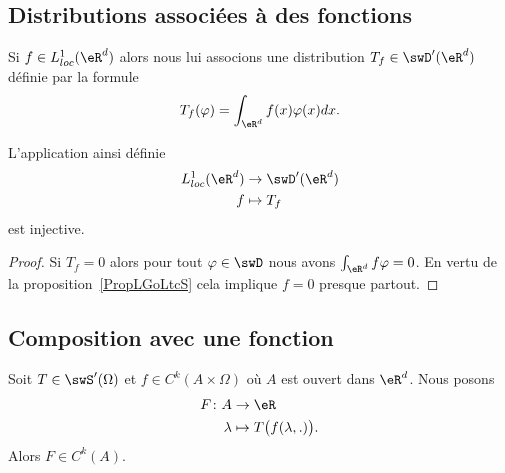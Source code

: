 \subsection{Distributions associées à des fonctions}

Si \( f\in L^1_{loc}(\eR^d)\) alors nous lui associons une distribution \( T_f\in \swD'(\eR^d)\) définie par la formule
\begin{equation}
    T_f(\varphi)=\int_{\eR^d}f(x)\varphi(x)dx.
\end{equation}

\begin{proposition}
    L'application ainsi définie
    \begin{equation}
        \begin{aligned}
            L^1_{loc}(\eR^d)&\to \swD'(\eR^d) \\
            f&\mapsto T_f
        \end{aligned}
    \end{equation}
    est injective.
\end{proposition}

\begin{proof}
    Si \( T_f=0\) alors pour tout \( \varphi\in \swD\) nous avons \( \int_{\eR^d}f\varphi=0\). En vertu de la proposition~\ref{PropLGoLtcS} cela implique \( f=0\) presque partout.
\end{proof}

\subsection{Composition avec une fonction}

\begin{proposition} \label{PropBQUOcyw}
    Soit \( T\in\swS'(\Omega)\) et \( f\in C^k(A\times \Omega)\) où \( A\) est ouvert dans \( \eR^d\). Nous posons
    \begin{equation}
        \begin{aligned}
            F\colon A&\to \eR \\
            \lambda&\mapsto T\big( f(\lambda,.) \big).
        \end{aligned}
    \end{equation}
    Alors \( F\in C^k(A)\).
\end{proposition}


